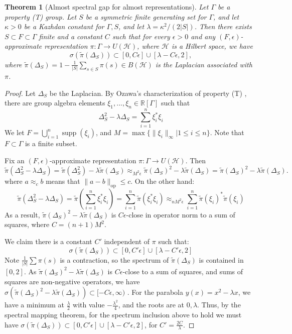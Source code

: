 \documentclass[11pt]{amsart}
\DeclareMathOperator{\op}{op}
\DeclareMathOperator{\supp}{supp}
\newcommand{\R}{{\mathbb{R}}}
\newcommand{\cH}{{\mathcal{H}}}
\newtheorem{theorem}{Theorem}[section]
\theoremstyle{definition}
\theoremstyle{remark}
\theoremstyle{definition}
\begin{document}
\begin{theorem}[Almost spectral gap for almost representations] \label{thm:op_main}
Let $\Gamma$ be a property (T) group. Let $S$ be a symmetric finite generating set for $\Gamma$, and let
$\kappa > 0$ be a Kazhdan constant for $\Gamma, S$, and let $\lambda = \kappa^2/(2|S|)$.
Then there exists $S \subset F \subset \Gamma$ finite and a constant $C$ such that for every $\epsilon > 0$ and any $(F,\epsilon)$-approximate
representation $\pi: \Gamma \to U(\mathcal H)$, where $\cH$ is a Hilbert space, we have 
$$ \sigma(\tilde{\pi}(\Delta_S)) \subset [0, C \epsilon] \cup [\lambda - C \epsilon, 2], $$
where $\tilde{\pi}(\Delta_S) = 1 - \frac{1}{|S|} \sum_{s \in S} \pi(s) \in B(\mathcal H)$ is the Laplacian associated with $\pi$.
\end{theorem}
\begin{proof}
    
Let $\Delta_S$ be the  Laplacian. By Ozawa's characterization of property (T) \cite{OzawaT}, there are group algebra elements $\xi_1,...,\xi_n\in \R[\Gamma]$ such that
$$ \Delta_S^2 - \lambda \Delta_S = \sum_{i=1}^n \xi_i^* \xi_i$$
We let $F = \bigcup_{i=1}^n \supp(\xi_i)$, and $M = \max \{ \| \xi_i \|_{\infty} \vert 1 \leq i \leq n \}$.
Note that $F \subset \Gamma$ is a finite subset.





Fix an $(F, \epsilon)$-approximate representation $\pi: \Gamma \to U(\mathcal H)$. Then 
$$\tilde{\pi}(\Delta_S^2 - \lambda\Delta_S) = \tilde{\pi}(\Delta_S^2) - \lambda \tilde{\pi}(\Delta_S) \approx_{M^2 \epsilon} \tilde{\pi}(\Delta_S)^2 - \lambda\tilde{\pi}(\Delta_S) = \tilde{\pi}(\Delta_S)^2 - \lambda \tilde{\pi}(\Delta_S).$$
where $a \approx_c b$ means that $\|a-b\|_{\op}\leq c$.
On the other hand:
$$ \tilde{\pi}(\Delta_S^2 - \lambda\Delta_S) = \tilde{\pi}(\sum_{i=1}^n \xi_i^* \xi_i) = \sum_{i=1}^n \tilde{\pi}(\xi_i^* \xi_i) \approx_{n M^2 \epsilon} \sum_{i=1}^n \tilde{\pi}(\xi_i)^* \tilde{\pi}(\xi_i)$$
As a result,  $\tilde{\pi}(\Delta_S)^2 - \lambda \tilde{\pi}(\Delta_S)$  is $C \epsilon$-close in operator norm to a sum of squares, where $C = (n+1)M^2$.

 
 We claim there is a constant $C'$ independent of $\pi$ such that:
    $$\sigma(\tilde{\pi}(\Delta_S)) \subset [0, C'\epsilon] \cup [\lambda - C'\epsilon, 2]$$
    Note $\frac{1}{|S|} \sum \pi(s)$ is a contraction, so the spectrum of $\tilde{\pi}(\Delta_S)$ is contained in $[0,2]$. As $\tilde{\pi}(\Delta_S)^2 - \lambda \tilde{\pi}(\Delta_S)$  is $C \epsilon$-close to a sum of squares, and sums of squares are non-negative operators, we have $\sigma(\tilde{\pi}(\Delta_S)^2 - \lambda \tilde{\pi}(\Delta_S)) \subset [-C\epsilon, \infty)$ .
    For the parabola $y(x) = x^2 - \lambda x$, we have a minimum at $\frac{\lambda}{2}$ with value $-\frac{\lambda^2}{4}$, and the roots are at $0, \lambda$. 
    Thus, by the spectral mapping theorem, for the spectrum inclusion above to hold we must have $\sigma(\tilde{\pi}(\Delta_S)) \subset [0, C' \epsilon] \cup [\lambda - C' \epsilon, 2]$, for $C' = \frac{2C}{\lambda}$. 
\end{proof}
\end{document}
